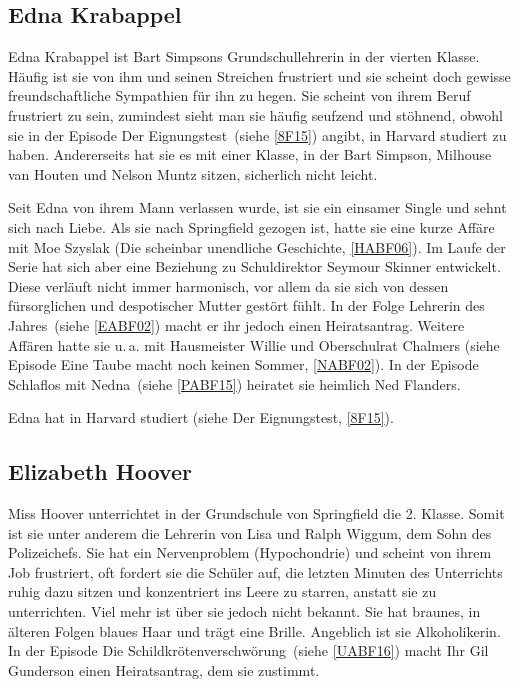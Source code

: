 \subsection{Edna Krabappel}\label{Krabappel}
Edna Krabappel ist Bart Simpsons Grundschullehrerin in der vierten Klasse. Häufig ist sie von ihm und seinen Streichen frustriert und sie scheint doch gewisse freundschaftliche Sympathien für ihn zu hegen. Sie scheint von ihrem Beruf frustriert zu sein, zumindest sieht man sie häufig seufzend und stöhnend, obwohl sie in der Episode \glqq Der Eignungstest\grqq\ (siehe \ref{8F15}) angibt, in Harvard studiert zu haben. Andererseits hat sie es mit einer Klasse, in der Bart Simpson, Milhouse van Houten und Nelson Muntz sitzen, sicherlich nicht leicht.

Seit Edna von ihrem Mann verlassen wurde, ist sie ein einsamer Single und sehnt sich nach Liebe. Als sie nach Springfield gezogen ist, hatte sie eine kurze Affäre mit Moe Szyslak (\glqq Die scheinbar unendliche Geschichte\grqq , \ref{HABF06}). Im Laufe der Serie hat sich aber eine Beziehung zu Schuldirektor Seymour Skinner entwickelt. Diese verläuft nicht immer harmonisch, vor allem da sie sich von dessen fürsorglichen und despotischer Mutter gestört fühlt. In der Folge \glqq Lehrerin des Jahres\grqq\ (siehe \ref{EABF02}) macht er ihr jedoch einen Heiratsantrag. Weitere Affären hatte sie u.\,a. mit Hausmeister Willie und Oberschulrat Chalmers (siehe Episode \glqq Eine Taube macht noch keinen Sommer\grqq , \ref{NABF02}). In der Episode \glqq Schlaflos mit Nedna\grqq\ (siehe \ref{PABF15}) heiratet sie heimlich Ned Flanders.

Edna hat in Harvard studiert (siehe \glqq Der Eignungstest\grqq, \ref{8F15}).


\subsection{Elizabeth Hoover}\label{ElizabethHoover}
Miss Hoover unterrichtet in der Grundschule von Springfield die 2. Klasse. Somit ist sie unter anderem die Lehrerin von Lisa und Ralph Wiggum, dem Sohn des Polizeichefs. Sie hat ein Nervenproblem (Hypochondrie) und scheint von ihrem Job frustriert, oft fordert sie die Schüler auf, die letzten Minuten des Unterrichts ruhig dazu sitzen und konzentriert ins Leere zu starren, anstatt sie zu unterrichten. Viel mehr ist über sie jedoch nicht bekannt. Sie hat braunes, in älteren Folgen blaues Haar und trägt eine Brille. Angeblich ist sie Alkoholikerin. In der Episode \glqq Die Schildkrötenverschwörung\grqq\ (siehe \ref{UABF16}) macht Ihr Gil Gunderson einen Heiratsantrag, dem sie zustimmt.

